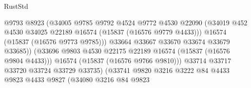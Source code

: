 \begin{lexlean}{RustStd}
\begin{coremodule}
                                            @9793
                                            @8923
                                            (@34005
                                              @9785
                                              @9792
                                              @4524
                                              @9772
                                              @4530
                                              @22090
                                              (@34019
                                                @452
                                                @4530
                                                @34025
                                                @22189
                                                @16574
                                                (@15837 (@16576 @9779 @4433)))
                                              @16574
                                              (@15837 (@16576 @9773 @9785)))
                                            @33664
                                            @33667
                                            @33670
                                            @33674
                                            @33679
                                            @33685))
                                        (@33696
                                          @9803
                                          @4530
                                          @22175
                                          @22189
                                          @16574
                                          (@15837 (@16576 @9804 @4433)))
                                        @16574
                                        (@15837 (@16576 @9766 @9810)))
                                      @33714
                                      @33717
                                      @33720
                                      @33724
                                      @33729
                                      @33735)
                                    (@33741
                                      @9820
                                      @3216
                                      @3222
                                      @84
                                      @4433
                                      @9823
                                      @4433
                                      @9827
                                      (@34080
                                        @3216
                                        @84
                                        @9823

\end{coremodule}
\end{lexlean}
